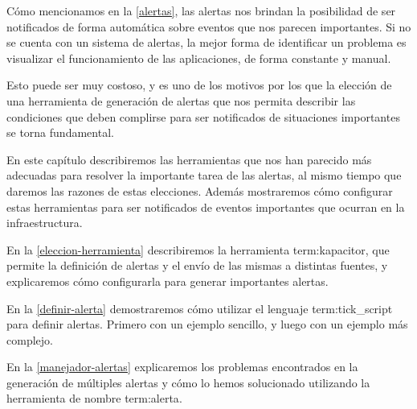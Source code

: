 Cómo mencionamos en la \autoref{alertas}, las alertas nos brindan la
posibilidad de ser notificados de forma automática sobre eventos que nos
parecen importantes.  Si no se cuenta con un sistema de alertas, la mejor forma
de identificar un problema es visualizar el funcionamiento de las aplicaciones,
de forma constante y manual.

Esto puede ser muy costoso, y es uno de los motivos por los que la elección de
una herramienta de generación de alertas que nos permita describir las
condiciones que deben complirse para ser notificados de situaciones importantes
se torna fundamental.

En este capítulo describiremos las herramientas que nos han parecido más
adecuadas para resolver la importante tarea de las alertas, al mismo tiempo que
daremos las razones de estas elecciones. Además mostraremos cómo configurar
estas herramientas para ser notificados de eventos importantes que ocurran en
la infraestructura.

En la \autoref{eleccion-herramienta} describiremos la herramienta
\gls{term:kapacitor}, que permite la definición de alertas y el envío de las
mismas a distintas fuentes, y explicaremos cómo configurarla para generar
importantes alertas.

En la \autoref{definir-alerta} demostraremos cómo utilizar el lenguaje
\gls{term:tick_script} para definir alertas. Primero con un ejemplo sencillo, y luego con
un ejemplo más complejo.

En la \autoref{manejador-alertas} explicaremos los problemas encontrados en la
generación de múltiples alertas y cómo lo hemos solucionado utilizando la
herramienta de nombre \gls{term:alerta}.
